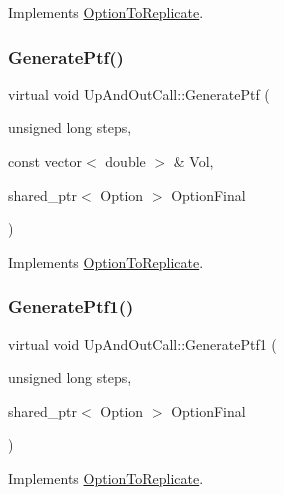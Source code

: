 Implements \hyperlink{classOptionToReplicate_ae744ce948286546566cd424eaa7ea5cb}{Option\+To\+Replicate}.

\hypertarget{classUpAndOutCall_a3afb135f946b6c42226c15a36a0b1971}{}\label{classUpAndOutCall_a3afb135f946b6c42226c15a36a0b1971} 
\subsubsection{\texorpdfstring{Generate\+Ptf()}{GeneratePtf()}\hspace{0.1cm}{\footnotesize\ttfamily [2/2]}}
{\footnotesize\ttfamily virtual void Up\+And\+Out\+Call\+::\+Generate\+Ptf (\begin{DoxyParamCaption}\item[{unsigned long}]{steps,  }\item[{const vector$<$ double $>$ \&}]{Vol,  }\item[{shared\+\_\+ptr$<$ Option $>$}]{Option\+Final }\end{DoxyParamCaption})\hspace{0.3cm}{\ttfamily [virtual]}}



Implements \hyperlink{classOptionToReplicate_a47ad183412648a70cd77957383eb421f}{Option\+To\+Replicate}.

\hypertarget{classUpAndOutCall_a2e25a8a717d611d6593fb9387e9d3b22}{}\label{classUpAndOutCall_a2e25a8a717d611d6593fb9387e9d3b22} 
\subsubsection{\texorpdfstring{Generate\+Ptf1()}{GeneratePtf1()}}
{\footnotesize\ttfamily virtual void Up\+And\+Out\+Call\+::\+Generate\+Ptf1 (\begin{DoxyParamCaption}\item[{unsigned long}]{steps,  }\item[{shared\+\_\+ptr$<$ Option $>$}]{Option\+Final }\end{DoxyParamCaption})\hspace{0.3cm}{\ttfamily [virtual]}}



Implements \hyperlink{classOptionToReplicate_ad3315e5766faa9be46fa690d8d358b9d}{Option\+To\+Replicate}.

